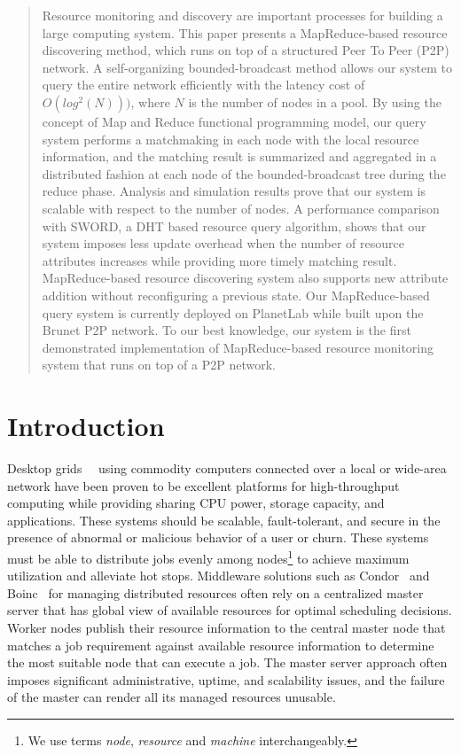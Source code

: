\documentclass{acm_proc_article-sp}
\begin{document}
\begin{abstract}
Resource monitoring and discovery are important processes for building a large computing system.
This paper presents a MapReduce-based resource discovering method, which runs on top of a structured Peer To Peer (P2P) network.
A self-organizing bounded-broadcast method allows our system to query the entire network efficiently with the latency cost of $O(log^2(N)))$, where $N$ is the number of nodes in a pool.
By using the concept of Map and Reduce functional programming model, our query system performs a matchmaking in each node with the local resource information,
and the matching result is summarized and aggregated in a distributed fashion at each node of the bounded-broadcast tree during the reduce phase.
Analysis and simulation results prove that our system is scalable with respect to the number of nodes. A performance comparison with SWORD, a DHT based resource query algorithm,
shows that our system imposes less update overhead when the number of resource attributes increases while providing more timely matching result.
MapReduce-based resource discovering system also supports new attribute addition without reconfiguring a previous state.
Our MapReduce-based query system is currently deployed on PlanetLab while built upon the Brunet P2P network. To our best knowledge, our system is the first demonstrated implementation of MapReduce-based resource monitoring system that runs on top of a P2P network.
\end{abstract}
\section{Introduction}
Desktop grids~\cite{bonic}~\cite{condor} using commodity computers connected over a local or wide-area network have been proven to be excellent platforms 
for high-throughput computing while providing sharing CPU power, storage  capacity, and applications.
These systems should be scalable, fault-tolerant, and secure in the presence of abnormal or malicious behavior of a user or churn. 
These systems must be able to distribute jobs evenly among nodes\footnote{We use terms \textit{node}, \textit{resource} and \textit{machine} interchangeably.} to achieve maximum utilization and alleviate hot stops. 
Middleware solutions such as Condor~\cite{condor} and Boinc~\cite{bonic} for managing distributed resources often rely on a centralized master server that has global view of available resources for optimal scheduling decisions. 
Worker nodes publish their resource information to the central master node that matches a job requirement against available resource information to determine the most suitable node that can execute a job. 
The master server approach often imposes significant administrative, uptime, and scalability issues, and the failure of the master can render all its managed resources unusable.  
\end{document}
